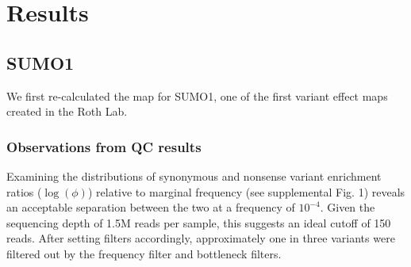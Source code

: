 \documentclass{article}
\begin{document}

\section{Results}
\subsection{SUMO1}
We first re-calculated the map for SUMO1, one of the first variant effect maps created in the Roth Lab\cite{weile_framework_2017}.
\subsubsection{Observations from QC results}

Examining the distributions of synonymous and nonsense variant enrichment ratios ($\log(\phi)$) relative to marginal frequency (see supplemental Fig. 1) reveals an acceptable separation between the two at a frequency of $10^{-4}$. Given the sequencing depth of 1.5M reads per sample, this suggests an ideal cutoff of 150 reads. After setting filters accordingly, approximately one in three variants were filtered out by the frequency filter and bottleneck filters.

\end{document}

